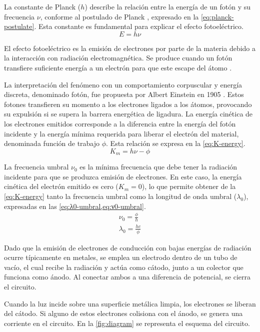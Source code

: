 La constante de Planck (\( h \)) describe la relación entre la energía de un
fotón y su frecuencia \( \nu \), conforme al postulado de Planck
\cite{planck1900}, expresado en la \cref{eq:planck-postulate}.
Esta constante es fundamental para explicar el efecto fotoeléctrico.
\begin{equation}\label{eq:planck-postulate}
  E = h\nu
\end{equation}

El efecto fotoeléctrico es la emisión de electrones por parte de la materia
debido a la interacción con radiación electromagnética.
Se produce cuando un fotón transfiere suficiente energía a un electrón para que
este escape del átomo \cite{beiser-1981}.

La interpretación del fenómeno con un comportamiento corpuscular y energía
discreta, denominado fotón, fue propuesta por Albert Einstein en 1905
\cite{einstein1905}.
Estos fotones transfieren su momento a los electrones
ligados a los átomos, provocando su expulsión si se supera la barrera energética
de ligadura.
La energía cinética de los electrones emitidos corresponde a la diferencia entre
la energía del fotón incidente y la energía mínima requerida para liberar el
electrón del material, denominada función de trabajo \( \phi \).
Esta relación se expresa en la \cref{eq:K-energy}.
\begin{equation}\label{eq:K-energy}
  K_{m} = h\nu - \phi
\end{equation}

La frecuencia umbral \( \nu_0 \) es la mínima frecuencia que debe tener la
radiación incidente para que se produzca emisión de electrones.
En este caso, la energía cinética del electrón emitido es cero (\( K_m = 0 \)),
lo que permite obtener de la \cref{eq:K-energy} tanto la frecuencia umbral como
la longitud de onda umbral (\( \lambda_0 \)), expresadas en las
\cref{eq:λ0-umbral,eq:ν0-umbral}.
\begin{gather}
  \nu_0 = \frac{\phi}{h} \label{eq:λ0-umbral} \\
  \lambda_0 = \frac{hc}{\phi} \label{eq:ν0-umbral}
\end{gather}

Dado que la emisión de electrones de conducción con bajas energías de radiación
ocurre típicamente en metales, se emplea un electrodo dentro de un tubo de vacío,
el cual recibe la radiación y actúa como cátodo, junto a un colector que funciona
como ánodo.
Al conectar ambos a una diferencia de potencial, se cierra el circuito.

Cuando la luz incide sobre una superficie metálica limpia, los electrones se
liberan del cátodo.
Si alguno de estos electrones colisiona con el ánodo, se genera una corriente en
el circuito.
En la \cref{fig:diagram} se representa el esquema del circuito.

